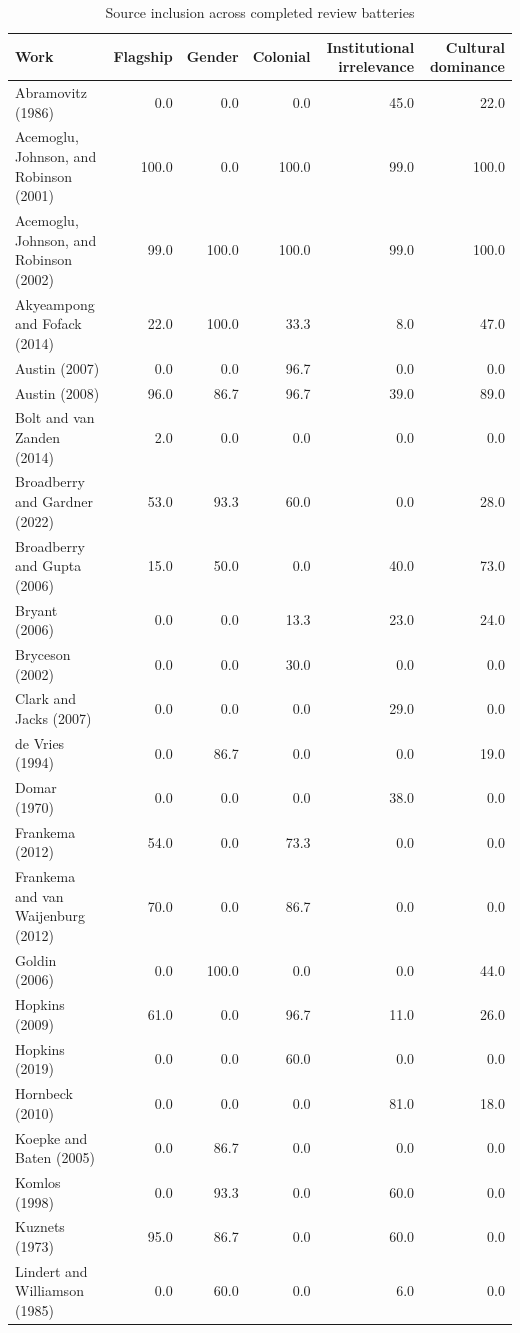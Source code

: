 \begin{table}[ht]
\centering
\caption{Source inclusion across completed review batteries}
\scriptsize
\begin{tabular}{lrrrrr}
\toprule
Work & Flagship & Gender & Colonial & Institutional irrelevance & Cultural dominance \\
\midrule
Abramovitz (1986) & 0.0 & 0.0 & 0.0 & 45.0 & 22.0 \\
Acemoglu, Johnson, and Robinson (2001) & 100.0 & 0.0 & 100.0 & 99.0 & 100.0 \\
Acemoglu, Johnson, and Robinson (2002) & 99.0 & 100.0 & 100.0 & 99.0 & 100.0 \\
Akyeampong and Fofack (2014) & 22.0 & 100.0 & 33.3 & 8.0 & 47.0 \\
Austin (2007) & 0.0 & 0.0 & 96.7 & 0.0 & 0.0 \\
Austin (2008) & 96.0 & 86.7 & 96.7 & 39.0 & 89.0 \\
Bolt and van Zanden (2014) & 2.0 & 0.0 & 0.0 & 0.0 & 0.0 \\
Broadberry and Gardner (2022) & 53.0 & 93.3 & 60.0 & 0.0 & 28.0 \\
Broadberry and Gupta (2006) & 15.0 & 50.0 & 0.0 & 40.0 & 73.0 \\
Bryant (2006) & 0.0 & 0.0 & 13.3 & 23.0 & 24.0 \\
Bryceson (2002) & 0.0 & 0.0 & 30.0 & 0.0 & 0.0 \\
Clark and Jacks (2007) & 0.0 & 0.0 & 0.0 & 29.0 & 0.0 \\
de Vries (1994) & 0.0 & 86.7 & 0.0 & 0.0 & 19.0 \\
Domar (1970) & 0.0 & 0.0 & 0.0 & 38.0 & 0.0 \\
Frankema (2012) & 54.0 & 0.0 & 73.3 & 0.0 & 0.0 \\
Frankema and van Waijenburg (2012) & 70.0 & 0.0 & 86.7 & 0.0 & 0.0 \\
Goldin (2006) & 0.0 & 100.0 & 0.0 & 0.0 & 44.0 \\
Hopkins (2009) & 61.0 & 0.0 & 96.7 & 11.0 & 26.0 \\
Hopkins (2019) & 0.0 & 0.0 & 60.0 & 0.0 & 0.0 \\
Hornbeck (2010) & 0.0 & 0.0 & 0.0 & 81.0 & 18.0 \\
Koepke and Baten (2005) & 0.0 & 86.7 & 0.0 & 0.0 & 0.0 \\
Komlos (1998) & 0.0 & 93.3 & 0.0 & 60.0 & 0.0 \\
Kuznets (1973) & 95.0 & 86.7 & 0.0 & 60.0 & 0.0 \\
Lindert and Williamson (1985) & 0.0 & 60.0 & 0.0 & 6.0 & 0.0 \\

\end{tabular}
\end{table}
